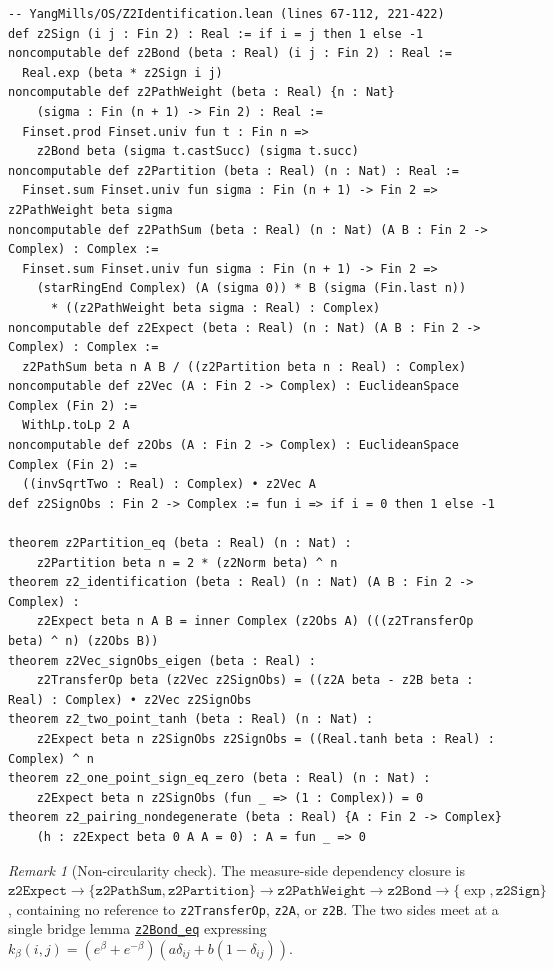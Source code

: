 \documentclass[11pt]{article}
\theoremstyle{remark}
\newtheorem{remark}[theorem]{Remark}
\theoremstyle{definition}
\newcommand{\lean}[1]{\texttt{#1}}
\newcommand{\anchor}{6b54eca695e96b3038ceda18276c4e28fb45983f}
\newcommand{\osline}[3]{%
  \href{https://github.com/lluiseriksson/THE-ERIKSSON-PROGRAMME/blob/\anchor/YangMills/OS/#1.lean\#L#2}{\nolinkurl{#3}}}
\begin{document}
\begin{footnotesize}
\begin{verbatim}
-- YangMills/OS/Z2Identification.lean (lines 67-112, 221-422)
def z2Sign (i j : Fin 2) : Real := if i = j then 1 else -1
noncomputable def z2Bond (beta : Real) (i j : Fin 2) : Real :=
  Real.exp (beta * z2Sign i j)
noncomputable def z2PathWeight (beta : Real) {n : Nat}
    (sigma : Fin (n + 1) -> Fin 2) : Real :=
  Finset.prod Finset.univ fun t : Fin n =>
    z2Bond beta (sigma t.castSucc) (sigma t.succ)
noncomputable def z2Partition (beta : Real) (n : Nat) : Real :=
  Finset.sum Finset.univ fun sigma : Fin (n + 1) -> Fin 2 => z2PathWeight beta sigma
noncomputable def z2PathSum (beta : Real) (n : Nat) (A B : Fin 2 -> Complex) : Complex :=
  Finset.sum Finset.univ fun sigma : Fin (n + 1) -> Fin 2 =>
    (starRingEnd Complex) (A (sigma 0)) * B (sigma (Fin.last n))
      * ((z2PathWeight beta sigma : Real) : Complex)
noncomputable def z2Expect (beta : Real) (n : Nat) (A B : Fin 2 -> Complex) : Complex :=
  z2PathSum beta n A B / ((z2Partition beta n : Real) : Complex)
noncomputable def z2Vec (A : Fin 2 -> Complex) : EuclideanSpace Complex (Fin 2) :=
  WithLp.toLp 2 A
noncomputable def z2Obs (A : Fin 2 -> Complex) : EuclideanSpace Complex (Fin 2) :=
  ((invSqrtTwo : Real) : Complex) • z2Vec A
def z2SignObs : Fin 2 -> Complex := fun i => if i = 0 then 1 else -1

theorem z2Partition_eq (beta : Real) (n : Nat) :
    z2Partition beta n = 2 * (z2Norm beta) ^ n
theorem z2_identification (beta : Real) (n : Nat) (A B : Fin 2 -> Complex) :
    z2Expect beta n A B = inner Complex (z2Obs A) (((z2TransferOp beta) ^ n) (z2Obs B))
theorem z2Vec_signObs_eigen (beta : Real) :
    z2TransferOp beta (z2Vec z2SignObs) = ((z2A beta - z2B beta : Real) : Complex) • z2Vec z2SignObs
theorem z2_two_point_tanh (beta : Real) (n : Nat) :
    z2Expect beta n z2SignObs z2SignObs = ((Real.tanh beta : Real) : Complex) ^ n
theorem z2_one_point_sign_eq_zero (beta : Real) (n : Nat) :
    z2Expect beta n z2SignObs (fun _ => (1 : Complex)) = 0
theorem z2_pairing_nondegenerate (beta : Real) {A : Fin 2 -> Complex}
    (h : z2Expect beta 0 A A = 0) : A = fun _ => 0
\end{verbatim}
\end{footnotesize}

\begin{remark}[Non-circularity check]
The measure-side dependency closure is
$\texttt{z2Expect} \to \{\texttt{z2PathSum}, \texttt{z2Partition}\} \to
\texttt{z2PathWeight} \to \texttt{z2Bond} \to \{\exp, \texttt{z2Sign}\}$,
containing no reference to \lean{z2TransferOp}, \lean{z2A}, or \lean{z2B}. The two sides
meet at a single bridge lemma \osline{Z2Identification}{118}{z2Bond\_eq} expressing
$k_\beta(i,j) = (e^\beta+e^{-\beta})(a\delta_{ij} + b(1-\delta_{ij}))$.
\end{remark}
\end{document}
